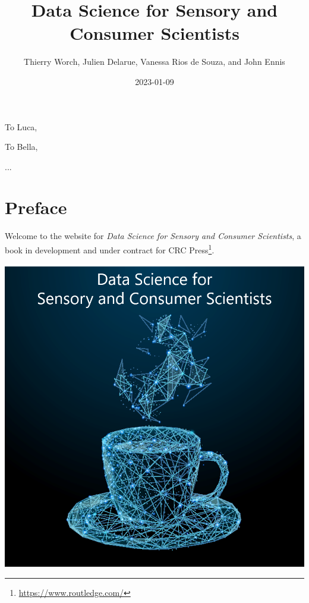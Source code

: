 \documentclass[
]{krantz}
\title{Data Science for Sensory and Consumer Scientists}
\author{Thierry Worch, Julien Delarue, Vanessa Rios de Souza, and John Ennis}
\date{2023-01-09}
\renewcommand{\href}[2]{#2\footnote{\url{#1}}}
\begin{document}
\maketitle


\thispagestyle{empty}

\begin{center}
To Luca,

To Bella,

...
\end{center}

\setlength{\abovedisplayskip}{-5pt}
\setlength{\abovedisplayshortskip}{-5pt}

{
\hypersetup{linkcolor=}
\setcounter{tocdepth}{2}
\tableofcontents
}
\hypertarget{preface}{%
\chapter*{Preface}\label{preface}}


Welcome to the website for \emph{Data Science for Sensory and Consumer Scientists}, a book in development and under contract for \href{https://www.routledge.com/}{CRC Press}.

\includegraphics[width=0.9\linewidth]{images/cover_art}
\end{document}
